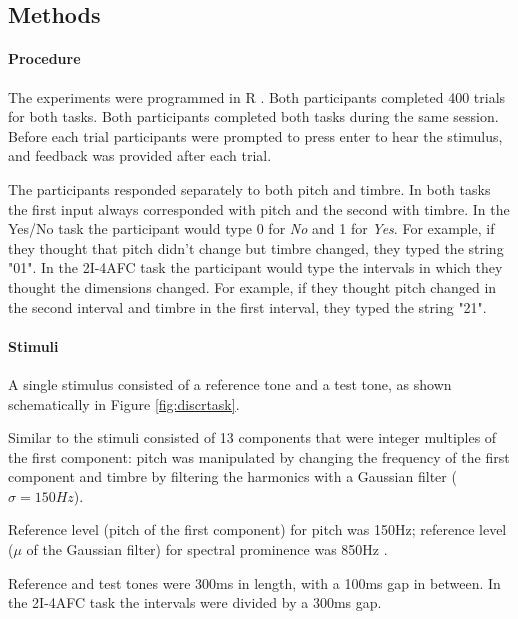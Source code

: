 \documentclass{article}\usepackage{knitr}
\begin{document}
\subsection{Methods}

\paragraph{Procedure}

The experiments were programmed in R \citep{r_language}. Both participants completed 400 trials for both tasks. Both participants completed both tasks during the same session.  Before each trial participants were prompted to press enter to hear the stimulus, and feedback was provided after each trial.

The participants responded separately to both pitch and timbre. In both tasks the first input always corresponded with pitch and the second with timbre. In the Yes/No task the participant would type 0 for \textit{No} and 1 for \textit{Yes}. For example, if they thought that pitch didn't change but timbre changed, they typed the string "01". In the 2I-4AFC task the participant would type the intervals in which they thought the dimensions changed. For example, if they thought pitch changed in the second interval and timbre in the first interval, they typed the string "21". 

\paragraph{Stimuli}

A single stimulus consisted of a reference tone and a test tone, as shown schematically in Figure \ref{fig:discrtask}. 

Similar to \citet{silbert2009} the stimuli consisted of 13 components that were integer multiples of the first component: pitch was manipulated by changing the frequency of the first component and timbre by filtering the harmonics with a Gaussian filter ($\sigma = 150Hz$).

Reference level (pitch of the first component) for pitch was 150Hz; reference level ($\mu$ of the Gaussian filter) for spectral prominence was 850Hz .

Reference and test tones were 300ms in length, with a 100ms gap in between. In the 2I-4AFC task the intervals were divided by a 300ms gap.
\end{document}
